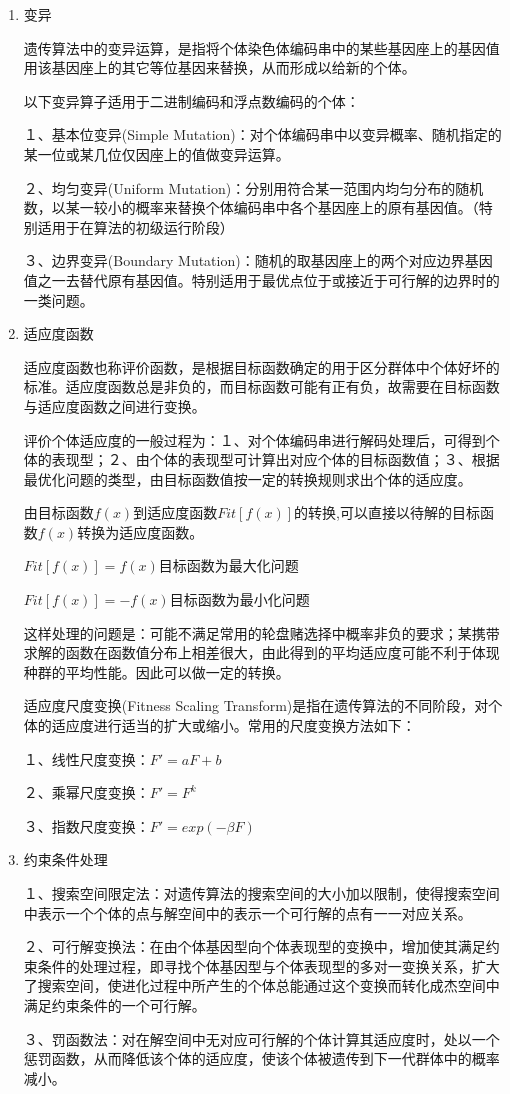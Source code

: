 \documentclass[10.5pt,twocolumn]{jbuaa}
\begin{document}
\begin{enumerate}[label = (\roman*)]
\item \hei 变异
\normalfont

遗传算法中的变异运算，是指将个体染色体编码串中的某些基因座上的基因值用该基因座上的其它等位基因来替换，从而形成以给新的个体。

以下变异算子适用于二进制编码和浮点数编码的个体：

１、基本位变异(Simple Mutation)：对个体编码串中以变异概率、随机指定的某一位或某几位仅因座上的值做变异运算。

２、均匀变异(Uniform Mutation)：分别用符合某一范围内均匀分布的随机数，以某一较小的概率来替换个体编码串中各个基因座上的原有基因值。（特别适用于在算法的初级运行阶段）

３、边界变异(Boundary Mutation)：随机的取基因座上的两个对应边界基因值之一去替代原有基因值。特别适用于最优点位于或接近于可行解的边界时的一类问题。
\item \hei 适应度函数
\normalfont

适应度函数也称评价函数，是根据目标函数确定的用于区分群体中个体好坏的标准。适应度函数总是非负的，而目标函数可能有正有负，故需要在目标函数与适应度函数之间进行变换。

评价个体适应度的一般过程为：１、对个体编码串进行解码处理后，可得到个体的表现型；２、由个体的表现型可计算出对应个体的目标函数值；３、根据最优化问题的类型，由目标函数值按一定的转换规则求出个体的适应度。

由目标函数$f(x)$到适应度函数$Fit[f(x)]$的转换,可以直接以待解的目标函数$f(x)$转换为适应度函数。

$Fit[f(x)]=f(x)$目标函数为最大化问题

$Fit[f(x)]=-f(x)$目标函数为最小化问题

这样处理的问题是：可能不满足常用的轮盘赌选择中概率非负的要求；某携带求解的函数在函数值分布上相差很大，由此得到的平均适应度可能不利于体现种群的平均性能。因此可以做一定的转换。

适应度尺度变换(Fitness Scaling Transform)是指在遗传算法的不同阶段，对个体的适应度进行适当的扩大或缩小。常用的尺度变换方法如下：

１、线性尺度变换：$F'=aF+b$

２、乘幂尺度变换：$F'=F^{k}$

３、指数尺度变换：$F'=exp(-\beta F)$

\item \hei 约束条件处理

\normalfont
１、搜索空间限定法：对遗传算法的搜索空间的大小加以限制，使得搜索空间中表示一个个体的点与解空间中的表示一个可行解的点有一一对应关系。

２、可行解变换法：在由个体基因型向个体表现型的变换中，增加使其满足约束条件的处理过程，即寻找个体基因型与个体表现型的多对一变换关系，扩大了搜索空间，使进化过程中所产生的个体总能通过这个变换而转化成杰空间中满足约束条件的一个可行解。

３、罚函数法：对在解空间中无对应可行解的个体计算其适应度时，处以一个惩罚函数，从而降低该个体的适应度，使该个体被遗传到下一代群体中的概率减小。
\end{enumerate}
\end{document}
